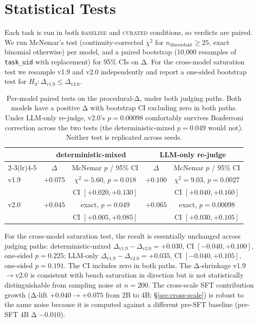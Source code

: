 \documentclass[10pt]{article}
\newcommand{\BL}{\textsc{baseline}\xspace}
\newcommand{\CU}{\textsc{curated}\xspace}
\begin{document}
\section{Statistical Tests}\label{sec:stats}

Each task is run in both \BL{} and \CU{} conditions, so verdicts are paired. We run McNemar's test (continuity-corrected $\chi^2$ for $n_{\mathrm{discordant}} \geq 25$, exact binomial otherwise) per model, and a paired bootstrap (10{,}000 resamples of \texttt{task\_uid} with replacement) for 95\% CIs on Δ. For the cross-model saturation test we resample v1.9 and v2.0 independently and report a one-sided bootstrap test for $H_0: \Delta_{\mathrm{v1.9}} \leq \Delta_{\mathrm{v2.0}}$.

\begin{table}[h]
\centering
\small
\begin{tabular}{@{}l c c c c@{}}
\toprule
& \multicolumn{2}{c}{\textbf{deterministic-mixed}} & \multicolumn{2}{c}{\textbf{LLM-only re-judge}} \\
\cmidrule(lr){2-3}\cmidrule(lr){4-5}
& $\Delta$ & McNemar $p$ / 95\% CI & $\Delta$ & McNemar $p$ / 95\% CI \\
\midrule
v1.9 & $+0.075$ & $\chi^2{=}5.60$, $p{=}0.018$ & $+0.100$ & $\chi^2{=}9.03$, $p{=}0.0027$ \\
     &          & CI $[+0.020, +0.130]$        &          & CI $[+0.040, +0.160]$ \\
v2.0 & $+0.045$ & exact, $p{=}0.049$           & $+0.065$ & exact, $p{=}0.00098$ \\
     &          & CI $[+0.005, +0.085]$        &          & CI $[+0.030, +0.105]$ \\
\bottomrule
\end{tabular}
\caption{Per-model paired tests on the procedural-Δ, under both judging paths. Both models have a positive Δ with bootstrap CI excluding zero in both paths. Under LLM-only re-judge, v2.0's $p{=}0.00098$ comfortably survives Bonferroni correction across the two tests (the deterministic-mixed $p{=}0.049$ would not). Neither test is replicated across seeds.}
\label{tab:stats-per-model}
\end{table}

For the cross-model saturation test, the result is essentially unchanged across judging paths: deterministic-mixed $\Delta_{\mathrm{v1.9}} - \Delta_{\mathrm{v2.0}} = +0.030$, CI $[-0.040, +0.100]$, one-sided $p = 0.225$; LLM-only $\Delta_{\mathrm{v1.9}} - \Delta_{\mathrm{v2.0}} = +0.035$, CI $[-0.040, +0.105]$, one-sided $p = 0.191$. The CI includes zero in both paths. The Δ-shrinkage v1.9$\to$v2.0 is consistent with bench saturation in direction but is not statistically distinguishable from sampling noise at $n{=}200$. The cross-scale SFT contribution growth (Δ-lift $+0.040 \to +0.075$ from 2B to 4B; \S\ref{sec:cross-scale}) is robust to the same noise because it is computed against a different pre-SFT baseline (pre-SFT 4B Δ $-0.010$).
\end{document}
